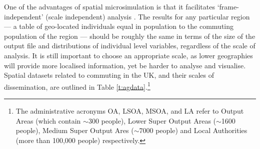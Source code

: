 One of the advantages of spatial microsimulation is that it facilitates
`frame-independent' (scale independent) analysis \citep{Horner2002}. The
results for any particular region --- a table of geo-located individuals equal
in population to the commuting population of the region --- should be roughly
the same in terms of the size of the output file and distributions of
individual level variables, regardless of the scale of analysis. It is
still important to choose an appropriate scale, as lower
geographies will provide more localised information, yet be harder
to analyse and visualise. 
Spatial datasets related to commuting in the UK, and their scales of
dissemination, are outlined
in Table \ref{t:agdata}.\footnote{The administrative acronyms OA, LSOA,
MSOA, and LA refer to Output Areas (which contain $\sim$300 people),
Lower Super Output Areas ($\sim$1600 people), Medium Super Output Ares
($\sim$7000 people) and Local Authorities (more than 100,000 people)
respectively.}

